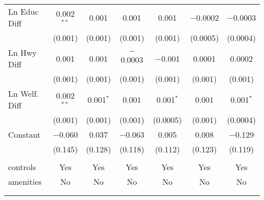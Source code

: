 \begin{table}[!htbp]
\begin{tabular}{@{\extracolsep{5pt}}lcccccc}
  Ln Educ Diff & 0.002$^{**}$ & 0.001 & 0.001 & 0.001 & $-$0.0002 & $-$0.0003 \\ 
  & (0.001) & (0.001) & (0.001) & (0.001) & (0.0005) & (0.0004) \\ 
  Ln Hwy Diff & 0.001 & 0.001 & $-$0.0003 & $-$0.001 & 0.0001 & 0.0002 \\ 
  & (0.001) & (0.001) & (0.001) & (0.001) & (0.001) & (0.001) \\ 
  Ln Welf. Diff & 0.002$^{**}$ & 0.001$^{*}$ & 0.001 & 0.001$^{*}$ & 0.001 & 0.001$^{*}$ \\ 
  & (0.001) & (0.001) & (0.001) & (0.0005) & (0.001) & (0.0004) \\ 
  Constant & $-$0.060 & 0.037 & $-$0.063 & 0.005 & 0.008 & $-$0.129 \\ 
  & (0.145) & (0.128) & (0.118) & (0.112) & (0.123) & (0.119) \\ 
 \hline \\[-1.8ex] 
controls & Yes & Yes & Yes & Yes & Yes & Yes \\ 
amenities & No & No & No & No & No & No \\ 
\hline \\[-1.8ex] 
\hline 
\hline \\[-1.8ex] 
\end{tabular} 
\end{table} 
